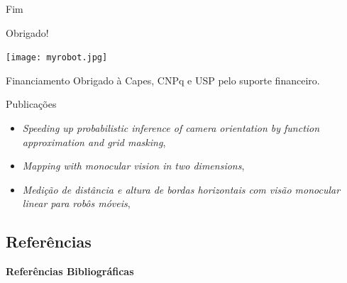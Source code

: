 \begin{frame}{Fim}
\begin{minipage}{10em}
  Obrigado!
\end{minipage}
\begin{minipage}{10em}
  \centerline{\texttt{[image: myrobot.jpg]}}
\end{minipage}

\vfill
\begin{block}{Financiamento}
  Obrigado à Capes, CNPq e USP pelo suporte financeiro.
\end{block}
\end{frame}



\appendix
{}
\setcounter{finalframe}{\value{framenumber}}


\begin{frame}{Publicações}
  \begin{itemize}
  \item {\em Speeding up probabilistic inference of camera orientation by function approximation and grid masking}, \cite{Werneck2011}
  \item {\em Mapping with monocular vision in two dimensions}, \cite{Werneck2010b}
  \item {\em Medição de distância e altura de bordas horizontais com visão monocular linear para robôs móveis}, \cite{Werneck2009}
  \end{itemize}
\end{frame}

\begin{frame}[allowframebreaks]
\section*{Referências}
\centerline{ \bf Referências Bibliográficas}
\vspace{-1\baselineskip}
\footnotesize
 
 
\end{frame}




